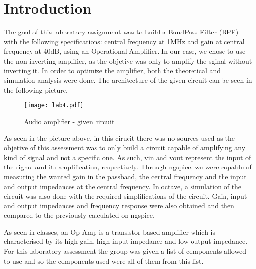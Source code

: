 \section{Introduction}
\label{sec:introduction}

\par The goal of this laboratory assignment was to build a BandPass Filter (BPF) with the following specifications: central frequency at 1MHz and gain at central frequency at 40dB, using an Operational Amplifier. In our case, we chose to use the non-inverting amplifier, as the objetive was only to amplify the sginal without inverting it. In order to optimize the amplifier, both the theoretical and simulation analysis were done. The architecture of the given circuit can be seen in the following picture.

\begin{figure}[H] \centering
	\texttt{[image: lab4.pdf]}
	\caption{Audio amplifier - given circuit}
	\label{fig:1}
\end{figure}

\par As seen in the picture above, in this cirucit there was no sources used as the objetive of this assessment was to only build a circuit capable of amplifying any kind of signal and not a specific one. As such, vin and vout represent the input of the signal and its amplification, respectively. Through ngspice,  we were capable of measuring the wanted gain in the passband, the central frequency and the input and output impedances at the central frequency. In octave, a simulation of the circuit was also done with the required simplifications of the circuit. Gain, input and output impedances and frequency response were also obtained and then compared to the previously calculated on ngspice.

\par As seen in classes, an Op-Amp is a transistor based amplifier which is characterised by its high gain, high input impedance and low output impedance. For this laboratory assessment the group was given a list of components allowed to use and so the components used were all of them from this list.

\newpage
